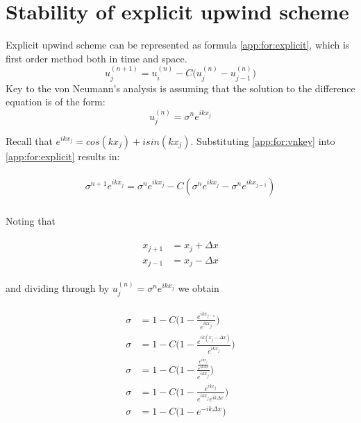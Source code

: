 \section{Stability of explicit upwind scheme}

	Explicit upwind scheme can be represented as formula \ref{app:for:explicit}, which is first order method both in time and space.
	\begin{equation}
		\label{app:for:explicit}
		u_j^{(n+1)} = u_i^{(n)} - C\Big(u_j^{(n)} - u_{j-1}^{(n)}\Big)
	\end{equation}
	Key to the von Neumann's analysis is assuming that the solution to the difference equation is of the form:
	\begin{equation}
		\label{app:for:vnkey}
		u_j^{(n)} = \sigma^ne^{ikx_j}
	\end{equation}
	
	Recall that $e^{ikx_j} = cos(kx_j) + isin(kx_j)$. Substituting \ref{app:for:vnkey} into \ref{app:for:explicit} results in:
	
	\begin{align}
		\begin{split}
			\sigma ^{n+1}e^{ikx_j} = \sigma^{n}{e^{ikx_j}} - C(\sigma ^{n}e^{ikx_j} - \sigma ^{n}e^{ikx_{j-1}}) \\
		\end{split}
	\end{align}
	
	Noting that
	
	\begin{align}
		\begin{split}
			x_{j+1} &= x_j + \Delta x \\
			x_{j-1} &= x_j - \Delta x
		\end{split}
	\end{align}
	
	and dividing through by $u_j^{(n)} = \sigma^ne^{ikx_j}$ we obtain
	
	\begin{align}
		\begin{split}
			\sigma &= 1 - C\Big(1 - \frac{e^{ikx_{j-1}}}{e^{ikx_j}}\Big) \\
			\sigma &= 1 - C\Big(1 - \frac{e^{ik (x_j - \Delta x)}}{e^{ikx_j}}\Big) \\
			\sigma &= 1 - C\Big(1 - \frac{\frac{e^{ikx_j}}{e^{ik\Delta x}}}{e^{ikx_j}}\Big) \\
			\sigma &= 1 - C\Big(1 - \frac{e^{ikx_j}}{e^{ikx_j}e^{ik\Delta x}}\Big) \\
			\sigma &= 1 - C\Big(1 - e^{-ik\Delta x}\Big) \\
		\end{split}
	\end{align}
	
